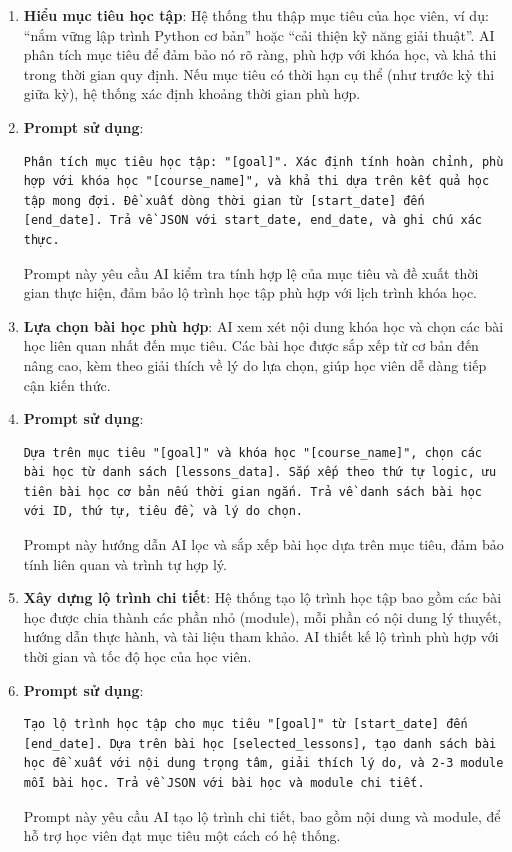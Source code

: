 \begin{enumerate}
	\item \textbf{Hiểu mục tiêu học tập}: Hệ thống thu thập mục tiêu của học viên, ví dụ: ``nắm vững lập trình Python cơ bản'' hoặc ``cải thiện kỹ năng giải thuật''. AI phân tích mục tiêu để đảm bảo nó rõ ràng, phù hợp với khóa học, và khả thi trong thời gian quy định. Nếu mục tiêu có thời hạn cụ thể (như trước kỳ thi giữa kỳ), hệ thống xác định khoảng thời gian phù hợp.

	\item \textbf{Prompt sử dụng}:
	      \begin{Verbatim}[breaklines=true]
		      Phân tích mục tiêu học tập: "[goal]". Xác định tính hoàn chỉnh, phù hợp với khóa học "[course_name]", và khả thi dựa trên kết quả học tập mong đợi. Đề xuất dòng thời gian từ [start_date] đến [end_date]. Trả về JSON với start_date, end_date, và ghi chú xác thực.
	      \end{Verbatim}
	      Prompt này yêu cầu AI kiểm tra tính hợp lệ của mục tiêu và đề xuất thời gian thực hiện, đảm bảo lộ trình học tập phù hợp với lịch trình khóa học.

	\item \textbf{Lựa chọn bài học phù hợp}: AI xem xét nội dung khóa học và chọn các bài học liên quan nhất đến mục tiêu. Các bài học được sắp xếp từ cơ bản đến nâng cao, kèm theo giải thích về lý do lựa chọn, giúp học viên dễ dàng tiếp cận kiến thức.

	\item \textbf{Prompt sử dụng}:
	      \begin{Verbatim}[breaklines=true]
		      Dựa trên mục tiêu "[goal]" và khóa học "[course_name]", chọn các bài học từ danh sách [lessons_data]. Sắp xếp theo thứ tự logic, ưu tiên bài học cơ bản nếu thời gian ngắn. Trả về danh sách bài học với ID, thứ tự, tiêu đề, và lý do chọn.
	      \end{Verbatim}
	      Prompt này hướng dẫn AI lọc và sắp xếp bài học dựa trên mục tiêu, đảm bảo tính liên quan và trình tự hợp lý.

	\item \textbf{Xây dựng lộ trình chi tiết}: Hệ thống tạo lộ trình học tập bao gồm các bài học được chia thành các phần nhỏ (module), mỗi phần có nội dung lý thuyết, hướng dẫn thực hành, và tài liệu tham khảo. AI thiết kế lộ trình phù hợp với thời gian và tốc độ học của học viên.

	\item \textbf{Prompt sử dụng}:
	      \begin{Verbatim}[breaklines=true]
		      Tạo lộ trình học tập cho mục tiêu "[goal]" từ [start_date] đến [end_date]. Dựa trên bài học [selected_lessons], tạo danh sách bài học đề xuất với nội dung trọng tâm, giải thích lý do, và 2-3 module mỗi bài học. Trả về JSON với bài học và module chi tiết.
	      \end{Verbatim}
	      Prompt này yêu cầu AI tạo lộ trình chi tiết, bao gồm nội dung và module, để hỗ trợ học viên đạt mục tiêu một cách có hệ thống.
\end{enumerate}

